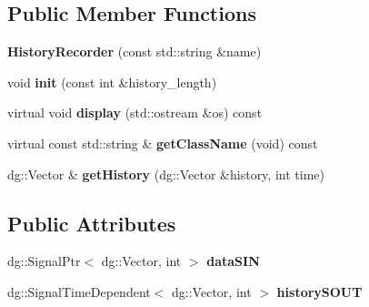 \subsection*{Public Member Functions}
\begin{DoxyCompactItemize}
\item 
{\bfseries History\+Recorder} (const std\+::string \&name)\hypertarget{classdg__tools_1_1HistoryRecorder_a6721706c9e6a34f970ce7632193d62bd}{}\label{classdg__tools_1_1HistoryRecorder_a6721706c9e6a34f970ce7632193d62bd}

\item 
void {\bfseries init} (const int \&history\+\_\+length)\hypertarget{classdg__tools_1_1HistoryRecorder_a6343e775716b1a277f3b35a1ea0c0252}{}\label{classdg__tools_1_1HistoryRecorder_a6343e775716b1a277f3b35a1ea0c0252}

\item 
virtual void {\bfseries display} (std\+::ostream \&os) const \hypertarget{classdg__tools_1_1HistoryRecorder_af6f1a11dfc70d030eeb13dc0b8e292d7}{}\label{classdg__tools_1_1HistoryRecorder_af6f1a11dfc70d030eeb13dc0b8e292d7}

\item 
virtual const std\+::string \& {\bfseries get\+Class\+Name} (void) const \hypertarget{classdg__tools_1_1HistoryRecorder_a2cacf7271a0531080165f25f31641d51}{}\label{classdg__tools_1_1HistoryRecorder_a2cacf7271a0531080165f25f31641d51}

\item 
dg\+::\+Vector \& {\bfseries get\+History} (dg\+::\+Vector \&history, int time)\hypertarget{classdg__tools_1_1HistoryRecorder_a323b9c4f6486c03fb0914871c96aeab6}{}\label{classdg__tools_1_1HistoryRecorder_a323b9c4f6486c03fb0914871c96aeab6}

\end{DoxyCompactItemize}
\subsection*{Public Attributes}
\begin{DoxyCompactItemize}
\item 
dg\+::\+Signal\+Ptr$<$ dg\+::\+Vector, int $>$ {\bfseries data\+S\+IN}\hypertarget{classdg__tools_1_1HistoryRecorder_a8b1355d794b870d23284745069065e97}{}\label{classdg__tools_1_1HistoryRecorder_a8b1355d794b870d23284745069065e97}

\item 
dg\+::\+Signal\+Time\+Dependent$<$ dg\+::\+Vector, int $>$ {\bfseries history\+S\+O\+UT}\hypertarget{classdg__tools_1_1HistoryRecorder_ab095d5c703884e65d6232c0ca3a9ab15}{}\label{classdg__tools_1_1HistoryRecorder_ab095d5c703884e65d6232c0ca3a9ab15}

\end{DoxyCompactItemize}
